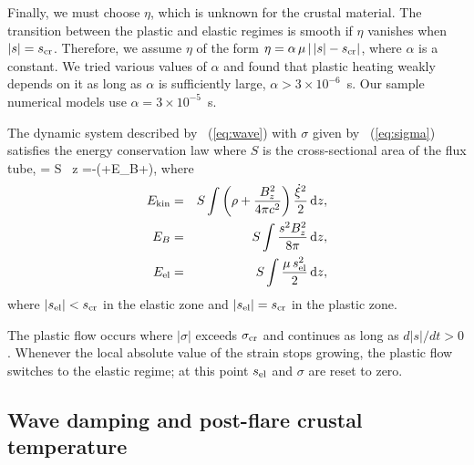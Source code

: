 Finally, we must choose $\eta$, which is unknown for the crustal material.
The transition between the plastic and elastic regimes is smooth if $\eta$ vanishes when $|s|=s_{\rm cr}$. 
Therefore, we assume $\eta$ of the form $\eta=\alpha\,\mu\,|\,|s|-s_{\rm cr}|$, where $\alpha$ is a constant.
We tried various values of $\alpha$ and found that plastic heating weakly depends on it as long as $\alpha$ is sufficiently large, $\alpha>3\times 10^{-6}$~s. 
Our sample numerical models use $\alpha=3\times 10^{-5}$~s.

The dynamic system described by \Eq~(\ref{eq:wave}) with $\sigma$ given by \Eq~(\ref{eq:sigma}) satisfies the energy conservation law where $S$ is the cross-sectional area of the flux tube,
\beq
\label{eq:energy}
   = S \int {}\, \md z =-\left(\Ekin+E_B+\Eel\right),
\eeq
where
\begin{eqnarray}
  E_{\rm kin}   &=& S \int \left(\rho+\frac{B_z^2}{4\pi c^2}\right) \frac{\dot{\xi}^2}{2}\, \mathrm{d} z,\\
  E_B &=& S \int \frac{s^2 B_z^2}{8\pi}\, \mathrm{d} z, \\
  E_{\rm el}    &=& S \int \frac{\mu\,s_{\rm el}^2}{2}\, \mathrm{d} z,
\end{eqnarray}
where $|s_{\rm el}|<s_{\rm cr}$ in the elastic zone and $|s_{\rm el}|=s_{\rm cr}$ in the plastic zone.

The plastic flow occurs where $|\sigma|$ exceeds $\sigma_{\rm cr}$ and continues as long as $d|s|/dt>0$. 
Whenever the local absolute value of the strain stops growing, the plastic flow switches to the elastic regime; at this point $s_{\rm el}$ and $\sigma$ are reset to zero.

\subsection{Wave damping and post-flare crustal temperature}

